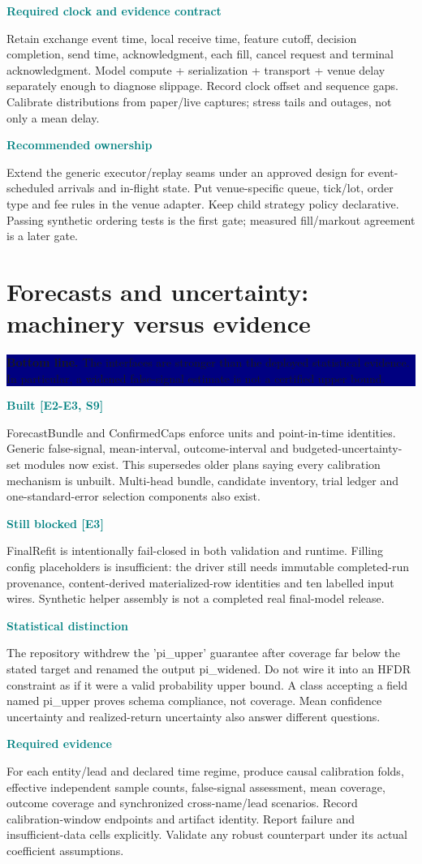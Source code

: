 \documentclass[10pt,letterpaper]{article}
\newcommand{\bl}[1]{\noindent\colorbox{navy}{\parbox{\dimexpr\linewidth-2\fboxsep}{\color{white}\textbf{Bottom line.} #1}}\par\medskip}
\newcommand{\topic}[2]{\clearpage\section{#1}\bl{#2}}
\newcommand{\sub}[1]{\par\textbf{\textcolor{teal}{#1}}\par}
\begin{document}
\sub{Required clock and evidence contract}
Retain exchange event time, local receive time, feature cutoff, decision completion, send time, acknowledgment, each fill, cancel request and terminal acknowledgment. Model compute + serialization + transport + venue delay separately enough to diagnose slippage. Record clock offset and sequence gaps. Calibrate distributions from paper/live captures; stress tails and outages, not only a mean delay.
\sub{Recommended ownership}
Extend the generic executor/replay seams under an approved design for event-scheduled arrivals and in-flight state. Put venue-specific queue, tick/lot, order type and fee rules in the venue adapter. Keep child strategy policy declarative. Passing synthetic ordering tests is the first gate; measured fill/markout agreement is a later gate.
\topic{Forecasts and uncertainty: machinery versus evidence}{The interfaces are stronger than the deployed statistical evidence. In particular, a widened false-signal estimate is not a certified upper bound.}
\sub{Built [E2-E3, S9]}
ForecastBundle and ConfirmedCaps enforce units and point-in-time identities. Generic false-signal, mean-interval, outcome-interval and budgeted-uncertainty-set modules now exist. This supersedes older plans saying every calibration mechanism is unbuilt. Multi-head bundle, candidate inventory, trial ledger and one-standard-error selection components also exist.
\sub{Still blocked [E3]}
FinalRefit is intentionally fail-closed in both validation and runtime. Filling config placeholders is insufficient: the driver still needs immutable completed-run provenance, content-derived materialized-row identities and ten labelled input wires. Synthetic helper assembly is not a completed real final-model release.
\sub{Statistical distinction}
The repository withdrew the 'pi\_upper' guarantee after coverage far below the stated target and renamed the output pi\_widened. Do not wire it into an HFDR constraint as if it were a valid probability upper bound. A class accepting a field named pi\_upper proves schema compliance, not coverage. Mean confidence uncertainty and realized-return uncertainty also answer different questions.
\sub{Required evidence}
For each entity/lead and declared time regime, produce causal calibration folds, effective independent sample counts, false-signal assessment, mean coverage, outcome coverage and synchronized cross-name/lead scenarios. Record calibration-window endpoints and artifact identity. Report failure and insufficient-data cells explicitly. Validate any robust counterpart under its actual coefficient assumptions.
\end{document}
